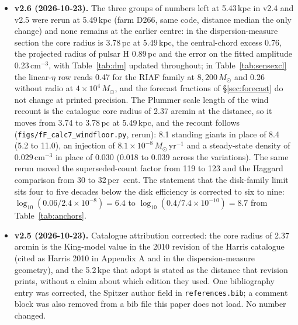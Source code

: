 \documentclass[11pt]{article}
\newcommand{\msun}{\ensuremath{M_\odot}}
\begin{document}
\begin{itemize}
\item \textbf{v2.6 (2026-10-23).} The three groups of numbers left at 5.43\,kpc in v2.4 and v2.5 were rerun at 5.49\,kpc (farm D266, same code, distance median the only change) and none remains at the earlier centre: in the dispersion-measure section the core radius is 3.78\,pc at 5.49\,kpc, the central-chord excess 0.76, the projected radius of pulsar H 0.89\,pc and the error on the fitted amplitude 0.23\,$\mathrm{cm^{-3}}$, with Table~\ref{tab:dm} updated throughout; in Table~\ref{tab:sensexcl} the linear-$\eta$ row reads 0.47 for the RIAF family at $8{,}200\,\msun$ and 0.26 without radio at $4\times10^{4}\,\msun$, and the forecast fractions of \S\ref{sec:forecast} do not change at printed precision. The Plummer scale length of the wind recount is the catalogue core radius of 2.37 arcmin at the distance, so it moves from 3.74 to 3.78\,pc at 5.49\,kpc, and the recount follows (\texttt{figs/fF\_calc7\_windfloor.py}, rerun): 8.1 standing giants in place of 8.4 (5.2 to 11.0), an injection of $8.1\times10^{-8}\,\msun\,\mathrm{yr^{-1}}$ and a steady-state density of $0.029\,\mathrm{cm^{-3}}$ in place of $0.030$ (0.018 to 0.039 across the variations). The same rerun moved the superseded-count factor from 119 to 123 and the Haggard comparison from 30 to 32\,per~cent. The statement that the disk-family limit sits four to five decades below the disk efficiency is corrected to six to nine: $\log_{10}(0.06/2.4\times10^{-8}) = 6.4$ to $\log_{10}(0.4/7.4\times10^{-10}) = 8.7$ from Table~\ref{tab:anchors}.
\item \textbf{v2.5 (2026-10-23).} Catalogue attribution corrected: the core radius of 2.37 arcmin is the King-model value in the 2010 revision of the Harris catalogue (cited as Harris 2010 in Appendix A and in the dispersion-measure geometry), and the 5.2\,kpc that \citet{Haggard2013} adopt is stated as the distance that revision prints, without a claim about which edition they used. One bibliography entry was corrected, the Spitzer author field in \texttt{references.bib}; a comment block was also removed from a bib file this paper does not load. No number changed.

\end{itemize}
\end{document}
